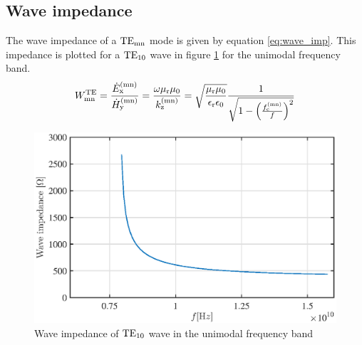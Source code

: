 \subsection{Wave impedance}
The wave impedance of a ${\rm TE}_{\rm mn}$ mode is given by equation \ref{eq:wave_imp}. This impedance is plotted for a ${\rm TE}_{\rm 10}$ wave in figure \ref{fig:wave_imp} for the unimodal frequency band.
\begin{equation}
W_{\rm mn}^{\rm TE} = \frac{\dot E_{\rm x}^{\rm (mn)}} {\dot H_{\rm y}^{\rm (mn)}} = \frac{\omega \mu_{\rm r} \mu_{\rm 0}} {k_{\rm z}^{\rm (mn)}} = \sqrt{\frac{\mu_{\rm r} \mu_{\rm 0}}{\epsilon_{\rm r} \epsilon_{\rm 0}}} \frac{1}{\sqrt{1 - \left(\frac{f_{\rm c}^{\rm (mn)}}{f}\right)^2}}
\label{eq:wave_imp}
\end{equation}

\begin{figure}[h t b p]
\centering
\includegraphics[width=\textwidth,keepaspectratio]{figures/wave_imp.eps}
\caption{Wave impedance of ${\rm TE}_{\rm 10}$ wave in the unimodal frequency band}
\label{fig:wave_imp}
\end{figure}